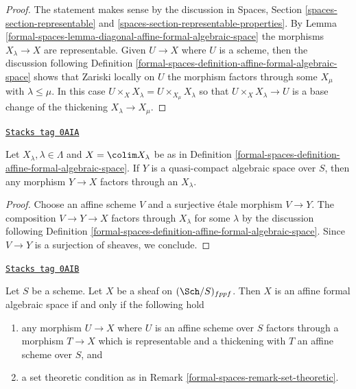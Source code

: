 \begin{proof}
The statement makes sense by the discussion in
Spaces, Section \ref{spaces-section-representable} and
\ref{spaces-section-representable-properties}.
By Lemma \ref{formal-spaces-lemma-diagonal-affine-formal-algebraic-space}
the morphisms $X_\lambda \to X$ are representable.
Given $U \to X$ where $U$ is a scheme,
then the discussion following
Definition \ref{formal-spaces-definition-affine-formal-algebraic-space}
shows that Zariski locally on $U$ the
morphism factors through some $X_\mu$ with $\lambda \leq \mu$.
In this case $U \times_X X_\lambda = U \times_{X_\mu} X_\lambda$
so that $U \times_X X_\lambda \to U$ is a base change of
the thickening $X_\lambda \to X_\mu$.
\end{proof}

\begin{lemma}
\label{formal-spaces-lemma-factor-through-thickening}
\href{https://stacks.math.columbia.edu/tag/0AIA}{\texttt{Stacks tag 0AIA}}

Let $X_\lambda, \lambda \in \Lambda$ and $X = \colim X_\lambda$
be as in Definition \ref{formal-spaces-definition-affine-formal-algebraic-space}.
If $Y$ is a quasi-compact algebraic space over $S$, then any
morphism $Y \to X$ factors through an $X_\lambda$.
\end{lemma}

\begin{proof}
Choose an affine scheme $V$ and a surjective \'etale morphism
$V \to Y$. The composition $V \to Y \to X$ factors through
$X_\lambda$ for some $\lambda$ by the discussion following
Definition \ref{formal-spaces-definition-affine-formal-algebraic-space}.
Since $V \to Y$ is a surjection of sheaves, we conclude.
\end{proof}

\begin{lemma}
\label{formal-spaces-lemma-characterize-affine-formal-algebraic-space}
\href{https://stacks.math.columbia.edu/tag/0AIB}{\texttt{Stacks tag 0AIB}}

Let $S$ be a scheme. Let $X$ be a sheaf on $(\Sch/S)_{fppf}$.
Then $X$ is an affine formal algebraic space if and only if
the following hold
\begin{enumerate}
\item any morphism $U \to X$ where $U$ is an affine scheme over $S$
factors through a morphism $T \to X$ which is representable and a
thickening with $T$ an affine scheme over $S$, and
\item a set theoretic condition as in Remark \ref{formal-spaces-remark-set-theoretic}.
\end{enumerate}
\end{lemma}

